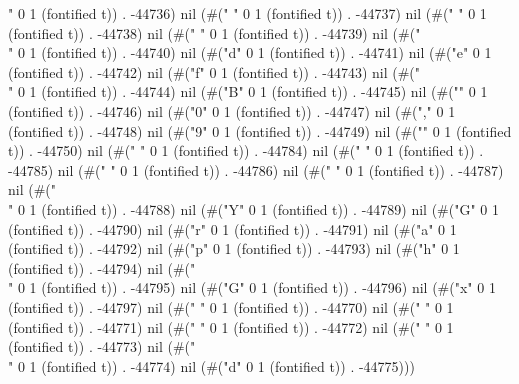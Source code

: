 " 0 1 (fontified t)) . -44736) nil (#(" " 0 1 (fontified t)) . -44737) nil (#(" " 0 1 (fontified t)) . -44738) nil (#(" " 0 1 (fontified t)) . -44739) nil (#("\\" 0 1 (fontified t)) . -44740) nil (#("d" 0 1 (fontified t)) . -44741) nil (#("e" 0 1 (fontified t)) . -44742) nil (#("f" 0 1 (fontified t)) . -44743) nil (#("\\" 0 1 (fontified t)) . -44744) nil (#("B" 0 1 (fontified t)) . -44745) nil (#("{" 0 1 (fontified t)) . -44746) nil (#("0" 0 1 (fontified t)) . -44747) nil (#("," 0 1 (fontified t)) . -44748) nil (#("9" 0 1 (fontified t)) . -44749) nil (#("}" 0 1 (fontified t)) . -44750) nil (#("
" 0 1 (fontified t)) . -44784) nil (#(" " 0 1 (fontified t)) . -44785) nil (#(" " 0 1 (fontified t)) . -44786) nil (#(" " 0 1 (fontified t)) . -44787) nil (#("\\" 0 1 (fontified t)) . -44788) nil (#("Y" 0 1 (fontified t)) . -44789) nil (#("G" 0 1 (fontified t)) . -44790) nil (#("r" 0 1 (fontified t)) . -44791) nil (#("a" 0 1 (fontified t)) . -44792) nil (#("p" 0 1 (fontified t)) . -44793) nil (#("h" 0 1 (fontified t)) . -44794) nil (#("\\" 0 1 (fontified t)) . -44795) nil (#("G" 0 1 (fontified t)) . -44796) nil (#("x" 0 1 (fontified t)) . -44797) nil (#("
" 0 1 (fontified t)) . -44770) nil (#(" " 0 1 (fontified t)) . -44771) nil (#(" " 0 1 (fontified t)) . -44772) nil (#(" " 0 1 (fontified t)) . -44773) nil (#("\\" 0 1 (fontified t)) . -44774) nil (#("d" 0 1 (fontified t)) . -44775)))
